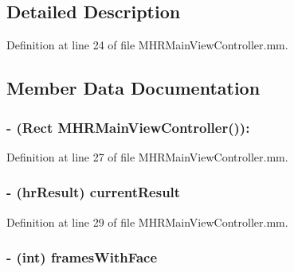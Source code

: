 \subsection{Detailed Description}


Definition at line 24 of file M\+H\+R\+Main\+View\+Controller.\+mm.



\subsection{Member Data Documentation}
\hypertarget{category_m_h_r_main_view_controller_07_08_a2508c2c272b97794449944d901733307}{
\subsubsection[{crop\+Area}]{\setlength{\rightskip}{0pt plus 5cm}-\/ (Rect {\bf M\+H\+R\+Main\+View\+Controller}())\+:\hspace{0.3cm}{\ttfamily [protected]}}}\label{category_m_h_r_main_view_controller_07_08_a2508c2c272b97794449944d901733307}


Definition at line 27 of file M\+H\+R\+Main\+View\+Controller.\+mm.

\hypertarget{category_m_h_r_main_view_controller_07_08_a8c4078159735c117ecbeb565b9c287e2}{
\subsubsection[{current\+Result}]{\setlength{\rightskip}{0pt plus 5cm}-\/ ({\bf hr\+Result}) current\+Result\hspace{0.3cm}{\ttfamily [protected]}}}\label{category_m_h_r_main_view_controller_07_08_a8c4078159735c117ecbeb565b9c287e2}


Definition at line 29 of file M\+H\+R\+Main\+View\+Controller.\+mm.

\hypertarget{category_m_h_r_main_view_controller_07_08_a796178035a8c8f1b629b666076fe1ef3}{
\subsubsection[{frames\+With\+Face}]{\setlength{\rightskip}{0pt plus 5cm}-\/ (int) frames\+With\+Face\hspace{0.3cm}{\ttfamily [protected]}}}\label{category_m_h_r_main_view_controller_07_08_a796178035a8c8f1b629b666076fe1ef3}


